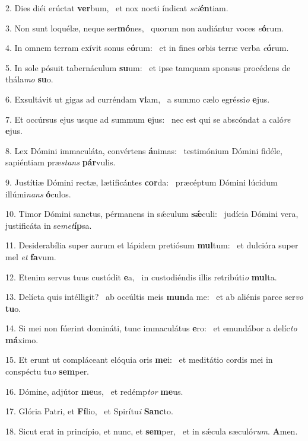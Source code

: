2. Dies diéi erúctat \textbf{ver}bum, \ast\  et nox nocti índicat \textit{sci}\textbf{én}tiam.\

3. Non sunt loquélæ, neque ser\textbf{mó}nes, \ast\  quorum non audiántur voces \textit{e}\textbf{ó}rum.\

4. In omnem terram exívit sonus e\textbf{ó}rum: \ast\  et in fines orbis terræ verba \textit{e}\textbf{ó}rum.\

5. In sole pósuit tabernáculum \textbf{su}um: \ast\  et ipse tamquam sponsus procédens de thála\textit{mo} \textbf{su}o.\

6. Exsultávit ut gigas ad curréndam \textbf{vi}am, \ast\  a summo cælo egréssi\textit{o} \textbf{e}jus.\

7. Et occúrsus ejus usque ad summum \textbf{e}jus: \ast\  nec est qui se abscóndat a caló\textit{re} \textbf{e}jus.\

8. Lex Dómini immaculáta, convértens \textbf{á}nimas: \ast\  testimónium Dómini fidéle, sapiéntiam præ\textit{stans} \textbf{pár}vulis.\

9. Justítiæ Dómini rectæ, lætificántes \textbf{cor}da: \ast\  præcéptum Dómini lúcidum illúmi\textit{nans} \textbf{ó}culos.\

10. Timor Dómini sanctus, pérmanens in sǽculum \textbf{sǽ}culi: \ast\  judícia Dómini vera, justificáta in se\textit{met}\textbf{íp}sa.\

11. Desiderabília super aurum et lápidem pretiósum \textbf{mul}tum: \ast\  et dulcióra super mel \textit{et} \textbf{fa}vum.\

12. Etenim servus tuus custódit \textbf{e}a, \ast\  in custodiéndis illis retribúti\textit{o} \textbf{mul}ta.\

13. Delícta quis intélligit? \dag\  ab occúltis meis \textbf{mun}da me: \ast\  et ab aliénis parce ser\textit{vo} \textbf{tu}o.\

14. Si mei non fúerint domináti, tunc immaculátus \textbf{e}ro: \ast\  et emundábor a delíc\textit{to} \textbf{má}ximo.\

15. Et erunt ut compláceant elóquia oris \textbf{me}i: \ast\  et meditátio cordis mei in conspéctu tu\textit{o} \textbf{sem}per.\

16. Dómine, adjútor \textbf{me}us, \ast\  et redémp\textit{tor} \textbf{me}us.\

17. Glória Patri, et \textbf{Fí}lio, \ast\  et Spirítu\textit{i} \textbf{Sanc}to.\

18. Sicut erat in princípio, et nunc, et \textbf{sem}per, \ast\  et in sǽcula sæculó\textit{rum}. \textbf{A}men.\

